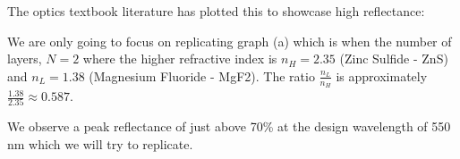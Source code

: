The optics textbook literature has plotted this to showcase high reflectance:



We are only going to focus on replicating graph (a) which is when the number of layers, $N=2$ where the higher refractive index is $n_H=2.35$ (Zinc Sulfide - ZnS) and $n_L=1.38$ (Magnesium Fluoride - MgF2). The ratio $\frac{n_L}{n_H}$ is approximately $\frac{1.38}{2.35} \approx 0.587$.


We observe a peak reflectance of just above 70\% at the design wavelength of 550 nm which we will try to replicate.

